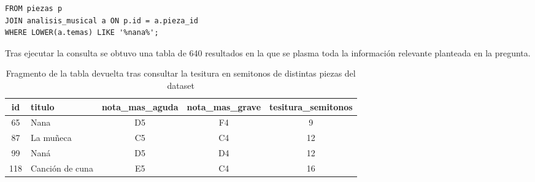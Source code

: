 \begin{itemize}
\begin{verbatim}
FROM piezas p
JOIN analisis_musical a ON p.id = a.pieza_id
WHERE LOWER(a.temas) LIKE '%nana%';
    \end{verbatim}    
    Tras ejecutar la consulta se obtuvo una tabla de 640 resultados en la que se plasma toda la información relevante planteada en la pregunta.
    
    \begin{table}[ht]
\centering
\begin{tabular}{|c|l|c|c|c|}
\hline
\textbf{id} & \textbf{titulo} & \textbf{nota\_mas\_aguda} & \textbf{nota\_mas\_grave} & \textbf{tesitura\_semitonos} \\
\hline
65  & Nana              & D5 & F4 & 9  \\
87  & La muñeca         & C5 & C4 & 12 \\
99  & Naná              & D5 & D4 & 12 \\
118 & Canción de cuna   & E5 & C4 & 16 \\
\hline
\end{tabular}
\caption{Fragmento de la tabla devuelta tras consultar la tesitura en semitonos de distintas piezas del dataset}
\label{tab:tesitura_piezas}
\end{table}
    




\end{itemize}
